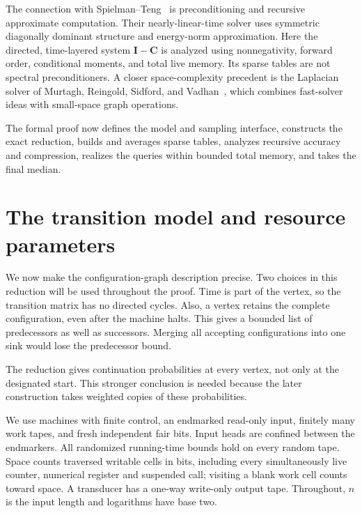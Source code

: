 \documentclass[11pt]{article}
\numberwithin{equation}{section}
\theoremstyle{definition}
\theoremstyle{remark}
\begin{document}
The connection with Spielman--Teng~\cite{SpielmanTeng2014} is preconditioning and recursive approximate computation. Their nearly-linear-time solver uses symmetric diagonally dominant structure and energy-norm approximation. Here the directed, time-layered system \(\mathbf I-\mathbf C\) is analyzed using nonnegativity, forward order, conditional moments, and total live memory. Its sparse tables are not spectral preconditioners. A closer space-complexity precedent is the Laplacian solver of Murtagh, Reingold, Sidford, and Vadhan~\cite{MurtaghReingoldSidfordVadhan2017}, which combines fast-solver ideas with small-space graph operations.

The formal proof now defines the model and sampling interface, constructs the exact reduction, builds and averages sparse tables, analyzes recursive accuracy and compression, realizes the queries within bounded total memory, and takes the final median.




\section{The transition model and resource parameters}\label{sec:model}

We now make the configuration-graph description precise. Two choices in this reduction will be used throughout the proof. Time is part of the vertex, so the transition matrix has no directed cycles. Also, a vertex retains the complete configuration, even after the machine halts. This gives a bounded list of predecessors as well as successors. Merging all accepting configurations into one sink would lose the predecessor bound.

The reduction gives continuation probabilities at every vertex, not only at the designated start. This stronger conclusion is needed because the later construction takes weighted copies of these probabilities.

We use machines with finite control, an endmarked read-only input,
finitely many work tapes, and fresh independent fair bits. Input heads
are confined between the endmarkers. All randomized running-time
bounds hold on every random tape. Space counts traversed writable cells
in bits, including every simultaneously live counter, numerical register
and suspended call; visiting a blank work cell counts toward space.
A transducer has a one-way write-only output tape. Throughout,
$n$ is the input length and logarithms have base two.
\end{document}
